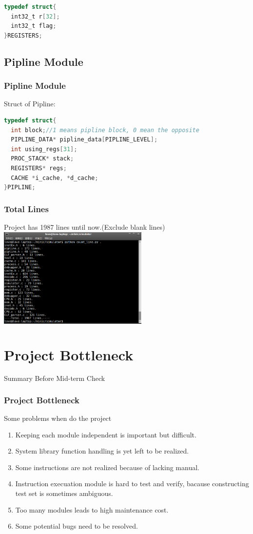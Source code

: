 \documentclass[CJK]{beamer}
\begin{document}
\begin{CJK}{UTF8}{gbsn}
\begin{frame}[fragile]
\begin{lstlisting}[language={C}]
typedef struct{
  int32_t r[32];
  int32_t flag;
}REGISTERS;
\end{lstlisting}
\end{frame}

\subsection{Pipline Module}
\begin{frame}[fragile]
  \frametitle{Pipline Module}
  Struct of Pipline:
\begin{lstlisting}[language={C}]
typedef struct{
  int block;//1 means pipline block, 0 mean the opposite
  PIPLINE_DATA* pipline_data[PIPLINE_LEVEL];
  int using_regs[31];
  PROC_STACK* stack;
  REGISTERS* regs;
  CACHE *i_cache, *d_cache;
}PIPLINE;
\end{lstlisting}
\end{frame}

\begin{frame}
  \frametitle{Total Lines}
  Project has {\color{blue}1987} lines until now.(Exclude blank lines)
  \includegraphics[height=5cm]{count_line.png}
\end{frame}

\section{Project Bottleneck}

\begin{frame}
  \huge{Summary Before Mid-term Check}
\end{frame}

\begin{frame}
  \frametitle{Project Bottleneck}
  Some problems when do the project
  \begin{enumerate}
    \item Keeping each module independent is important but difficult.
    \item System library function handling is yet left to be realized.
    \item Some instructions are not realized because of lacking manual.
    \item Instruction execuation module is hard to test and verify, bacause constructing test set is sometimes ambiguous.
    \item Too many modules leads to high maintenance cost.
    \item Some potential bugs need to be resolved.
  \end{enumerate}
\end{frame}


\end{CJK}
\end{document}
